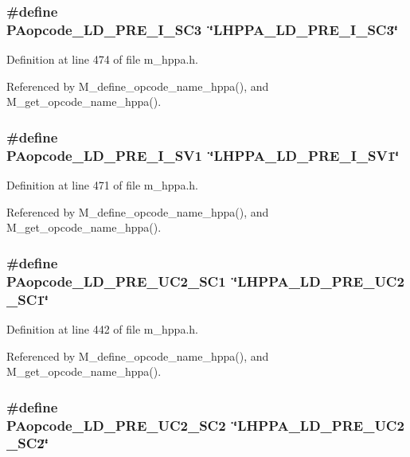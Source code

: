 \subsubsection{\setlength{\rightskip}{0pt plus 5cm}\#define PAopcode\_\-LD\_\-PRE\_\-I\_\-SC3~\char`\"{}LHPPA\_\-LD\_\-PRE\_\-I\_\-SC3\char`\"{}}\label{m__hppa_8h_48e5fc322f8b6e4660506b2f14b632c7}




Definition at line 474 of file m\_\-hppa.h.

Referenced by M\_\-define\_\-opcode\_\-name\_\-hppa(), and M\_\-get\_\-opcode\_\-name\_\-hppa().
\subsubsection{\setlength{\rightskip}{0pt plus 5cm}\#define PAopcode\_\-LD\_\-PRE\_\-I\_\-SV1~\char`\"{}LHPPA\_\-LD\_\-PRE\_\-I\_\-SV1\char`\"{}}\label{m__hppa_8h_b91d28a3383b431521d09b975693d40a}




Definition at line 471 of file m\_\-hppa.h.

Referenced by M\_\-define\_\-opcode\_\-name\_\-hppa(), and M\_\-get\_\-opcode\_\-name\_\-hppa().
\subsubsection{\setlength{\rightskip}{0pt plus 5cm}\#define PAopcode\_\-LD\_\-PRE\_\-UC2\_\-SC1~\char`\"{}LHPPA\_\-LD\_\-PRE\_\-UC2\_\-SC1\char`\"{}}\label{m__hppa_8h_42789a935b37a416c29f75934abc67bc}




Definition at line 442 of file m\_\-hppa.h.

Referenced by M\_\-define\_\-opcode\_\-name\_\-hppa(), and M\_\-get\_\-opcode\_\-name\_\-hppa().
\subsubsection{\setlength{\rightskip}{0pt plus 5cm}\#define PAopcode\_\-LD\_\-PRE\_\-UC2\_\-SC2~\char`\"{}LHPPA\_\-LD\_\-PRE\_\-UC2\_\-SC2\char`\"{}}\label{m__hppa_8h_fb4164e51ad29614cff81774988d5b25}





